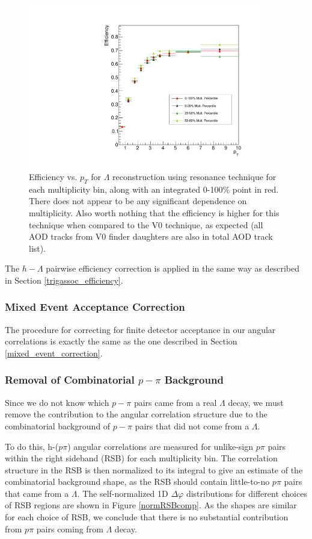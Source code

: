 \documentclass[ALICE,manyauthors]{ALICE_analysis_notes}
\begin{document}
\begin{figure}[ht]
\centering
\includegraphics[width=4in]{figures/res_efficiency.pdf}
\caption{Efficiency vs. $p_T$ for $\Lambda$ reconstruction using resonance technique for each multiplicity bin, along with an integrated 0-100\% point in red. There does not appear to be any significant dependence on multiplicity. Also worth nothing that the efficiency is higher for this technique when compared to the V0 technique, as expected (all AOD tracks from V0 finder daughters are also in total AOD track list).}
\label{lambda_eff_res}
\end{figure}

The $h-\Lambda$ pairwise efficiency correction is applied in the same way as described in Section \ref{trigassoc_efficiency}.

\subsubsection{Mixed Event Acceptance Correction}
\label{mixed_event_res}
The procedure for correcting for finite detector acceptance in our angular correlations is exactly the same as the one described in Section \ref{mixed_event_correction}.


\subsubsection{Removal of Combinatorial $p-\pi$ Background}
\label{removecomb}

Since we do not know which $p-\pi$ pairs came from a real $\Lambda$ decay, we must remove the contribution to the angular correlation structure due to the combinatorial background of $p-\pi$ pairs that did not come from a $\Lambda$.

To do this, h-($p\pi$) angular correlations are measured for unlike-sign $p\pi$ pairs within the right sideband (RSB) for each multiplicity bin. The correlation structure in the RSB is then normalized to its integral to give an estimate of the combinatorial background shape, as the RSB should contain little-to-no $p\pi$ pairs that came from a $\Lambda$. The self-normalized 1D $\Delta\varphi$ distributions for different choices of RSB regions are shown in Figure \ref{normRSBcomp}. As the shapes are similar for each choice of RSB, we conclude that there is no substantial contribution from $p\pi$ pairs coming from $\Lambda$ decay.
\end{document}
